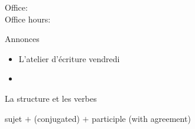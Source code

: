 \documentclass{beamer}
\subtitle[Passé composé (\lexi{être})]{Le passé composé avec \lexi{être} et plus d'aliments}
\begin{document}
  \begin{frame}
    \titlepage
    \tiny{Office: \\
          Office hours: }
  \end{frame}

  \begin{frame}{Annonces}
    \begin{itemize}
      \item L'atelier d'écriture vendredi
      \item[] 
    \end{itemize}
  \end{frame}

  \begin{frame}{La structure et les verbes}
    \begin{center}
      sujet $+$  (conjugated) $+$ participle (with agreement)
    \end{center}
  \end{frame}
\end{document}
